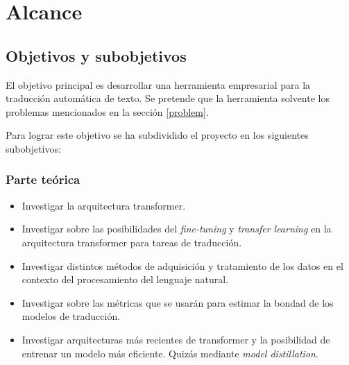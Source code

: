 \section{Alcance}
\subsection{Objetivos y subobjetivos}\label{objectives}
El objetivo principal es desarrollar una herramienta empresarial para la traducción automática
de texto.
Se pretende que la herramienta solvente los problemas mencionados en la sección \ref{problem}.

Para lograr este objetivo se ha subdividido el proyecto en los siguientes subobjetivos:

\subsubsection*{Parte teórica}
    \begin{itemize}
        \item Investigar la arquitectura transformer.
        \item Investigar sobre las posibilidades del \textit{fine-tuning} y \textit{transfer learning}
            en la arquitectura transformer para tareas de traducción.
        \item Investigar distintos métodos de adquisición y tratamiento de los datos en el contexto del
            procesamiento del lenguaje natural.
        \item Investigar sobre las métricas que se usarán para estimar la bondad de los modelos de traducción.
        \item Investigar arquitecturas más recientes de transformer y la posibilidad de entrenar
        un modelo más eficiente. Quizás mediante \textit{model distillation}.
    \end{itemize}
